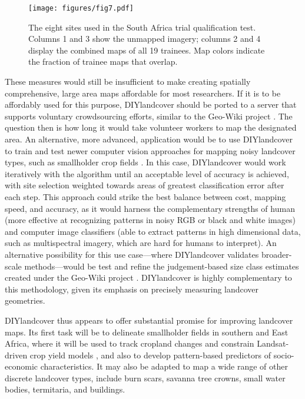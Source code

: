 \documentclass[preprint,12pt,authoryear]{elsarticle}
\begin{document}
\begin{figure}[!ht]
  \begin{center}
    \texttt{[image: figures/fig7.pdf]}
    \caption{The eight sites used in the South Africa trial qualification test. Columns 1 and 3 show the unmapped imagery; columns 2 and 4 display the combined maps of all 19 trainees.  Map colors indicate the fraction of trainee maps that overlap. } 
    \label{default}
  \end{center}
\end{figure}

These measures would still be insufficient to make creating spatially comprehensive, large area maps affordable for most researchers. If it is to be affordably used for this purpose, DIYlandcover should be ported to a server that supports voluntary crowdsourcing efforts, similar to the Geo-Wiki project \citep{fritz_geo-wiki:_2012}. The question then is how long it would take volunteer workers to map the designated area. An alternative, more advanced, application would be to use DIYlandcover to train and test newer computer vision approaches for mapping noisy landcover types, such as smallholder crop fields \citep[e.g.][]{debats_generalized_????}. In this case, DIYlandcover would work iteratively with the algorithm until an acceptable level of accuracy is achieved, with site selection weighted towards areas of greatest classification error after each step. This approach could strike the best balance between cost, mapping speed, and accuracy, as it would harness the complementary strengths of human (more effective at recognizing patterns in noisy RGB or black and white images) and computer image classifiers (able to extract patterns in high dimensional data, such as multispectral imagery, which are hard for humans to interpret).  An alternative possibility for this use case---where DIYlandcover validates broader-scale methods---would be test and refine the judgement-based size class estimates created under the Geo-Wiki project \citep{fritz_mapping_2015}. DIYlandcover is highly complementary to this methodology, given its emphasis on precisely measuring landcover geometries.   

DIYlandcover thus appears to offer substantial promise for improving landcover maps. Its first task will be to delineate smallholder fields in southern and East Africa, where it will be used to track cropland changes and constrain Landsat-driven crop yield models \citep{sibley_testing_2014}, and also to develop pattern-based predictors of socio-economic characteristics. It may also be adapted to map a wide range of other discrete landcover types, include burn scars, savanna tree crowns, small water bodies, termitaria, and buildings.  
\end{document}
